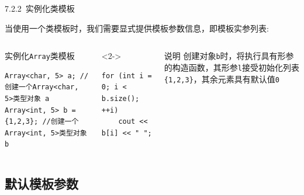 
\begin{frame}[fragile]{7.2.2~实例化类模板}

当使用一个类模板时，我们需要\alert{显式}提供模板参数信息，即\alert{模板实参列表}:

\vspace{-4mm}

\begin{columns}[t]

\begin{blueblock}{实例化\texttt{Array}类模板}
\begin{lstlisting}[moreemph={Array}]
Array<char, 5> a; //创建一个Array<char, 5>类型对象 a
Array<int, 5> b = {1,2,3}; //创建一个Array<int, 5>类型对象 b
\end{lstlisting}
\end{blueblock}
\begin{blueblock}<2->{}
\begin{lstlisting}[moreemph={Array}]
for (int i = 0; i < b.size(); ++i)
    cout << b[i] << " ";
\end{lstlisting}
\end{blueblock}

\begin{yellowblock}{说明}
创建对象\texttt{b}时，将执行具有形参的构造函数，其形参\texttt{l}接受初始化列表 \texttt{\{1,2,3\}}，其余元素具有默认值\texttt{0}
\end{yellowblock}


\end{columns}

\end{frame}


\subsection{默认模板参数}


